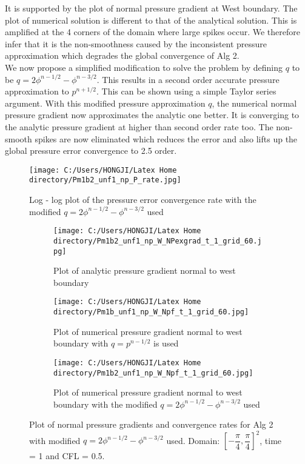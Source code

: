 It is supported by the plot of normal pressure gradient at West boundary. The plot of numerical solution is different to that of the analytical solution. This is amplified at the 4 corners of the domain where large spikes occur. We therefore infer that it is the non-smoothness caused by the inconsistent pressure approximation which degrades the global convergence of Alg 2.\\

We now propose a simplified modification to solve the problem by defining $q$ to be $q = 2\phi^{n-1/2} - \phi^{n-3/2}$. This results in a second order accurate pressure approximation to $p^{n+1/2}$. This can be shown using a simple Taylor series argument. With this modified pressure approximation $q$, the numerical normal pressure gradient now approximates the analytic one better. It is converging to the analytic pressure gradient at higher than second order rate too. The non-smooth spikes are now eliminated which reduces the error and also lifts up the global pressure error convergence to 2.5 order.

\begin{figure}[H]
	\centering
	\texttt{[image: C:/Users/HONGJI/Latex Home directory/Pm1b2\_unf1\_np\_P\_rate.jpg]}
	\caption{Log - log plot of the pressure error convergence rate with the modified $q = 2\phi^{n-1/2} - \phi^{n-3/2}$ used }\label{fig:6.23}
\end{figure}

\begin{figure}[H]
	\centering
	\begin{subfigure}[t]{2.6in}
		\centering
		\texttt{[image: C:/Users/HONGJI/Latex Home directory/Pm1b2\_unf1\_np\_W\_NPexgrad\_t\_1\_grid\_60.jpg]}
		\caption{Plot of analytic pressure gradient normal to west boundary}\label{fig:6.19a}		
	\end{subfigure}
	\quad
	\begin{subfigure}[t]{2.2in}
		\centering
		\texttt{[image: C:/Users/HONGJI/Latex Home directory/Pm1b\_unf1\_np\_W\_Npf\_t\_1\_grid\_60.jpg]}
		\caption{Plot of numerical pressure gradient normal to west boundary with $q = p^{n-1/2}$ is used}\label{fig:6.19b}
	\end{subfigure}
	\quad
	\centering
	\begin{subfigure}[t]{2.5in}
		\centering
		\texttt{[image: C:/Users/HONGJI/Latex Home directory/Pm1b2\_unf1\_np\_W\_Npf\_t\_1\_grid\_60.jpg]}
		\caption{Plot of numerical pressure gradient normal to west boundary with the modified $q = 2\phi^{n-1/2} - \phi^{n-3/2}$ used}\label{fig:6.19a}		
	\end{subfigure}
	\caption{Plot of normal pressure gradients and convergence rates for Alg 2 with modified $q = 2\phi^{n-1/2} - \phi^{n-3/2}$ used. Domain: $[-\dfrac{\pi}{4}, \dfrac{\pi}{4}]^2$, time = 1 and CFL = 0.5.}\label{fig:6.16}
\end{figure}


